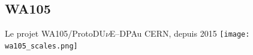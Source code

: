     \subsection{WA105}


    \begin{frame}{Le projet WA105/ProtoDU$\nu$E--DP}{Au CERN, depuis 2015}
        \centering
       	\vspace{-0.5cm}\hspace{-0.4cm}\texttt{[image: wa105\_scales.png]}
    \end{frame}
    
